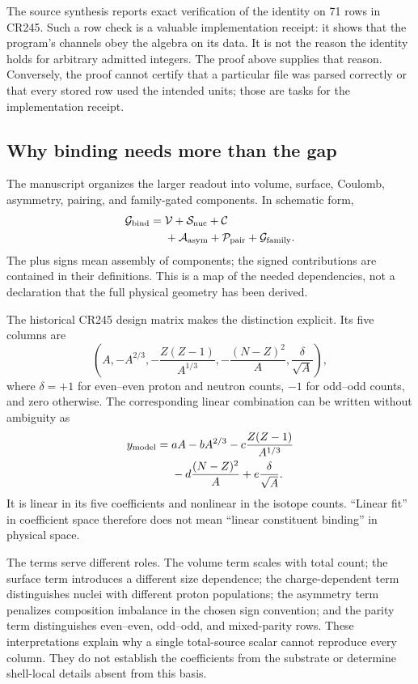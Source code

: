 The source synthesis reports exact verification of the identity on 71 rows in CR245. Such a row check is a valuable implementation receipt: it shows that the program's channels obey the algebra on its data. It is not the reason the identity holds for arbitrary admitted integers. The proof above supplies that reason. Conversely, the proof cannot certify that a particular file was parsed correctly or that every stored row used the intended units; those are tasks for the implementation receipt.\cite{viispine,viicr245}

\subsection{Why binding needs more than the gap}
\label{v2c5:nonlinear}

The manuscript organizes the larger readout into volume, surface, Coulomb, asymmetry, pairing, and family-gated components. In schematic form,
\begin{align}
 \mathcal G_{\rm bind}
 ={}&\mathcal V+\mathcal S_{\rm nuc}+\mathcal C\nonumber\\
   &+\mathcal A_{\rm asym}+\mathcal P_{\rm pair}
    +\mathcal G_{\rm family}.
 \label{v2c5:geometry}
\end{align}
The plus signs mean assembly of components; the signed contributions are contained in their definitions. This is a map of the needed dependencies, not a declaration that the full physical geometry has been derived.

The historical CR245 design matrix makes the distinction explicit. Its five columns are
\begin{equation}
 \left(A,-A^{2/3},-\frac{Z(Z-1)}{A^{1/3}},
       -\frac{(N-Z)^2}{A},\frac{\delta}{\sqrt A}\right),
 \label{v2c5:design}
\end{equation}
where $\delta=+1$ for even--even proton and neutron counts, $-1$ for odd--odd counts, and zero otherwise. The corresponding linear combination can be written without ambiguity as
\begin{align}
 y_{\rm model}={}&aA-bA^{2/3}
 -c\frac{Z(Z-1)}{A^{1/3}}\nonumber\\
 &-d\frac{(N-Z)^2}{A}+e\frac{\delta}{\sqrt A}.
 \label{v2c5:bw}
\end{align}
It is linear in its five coefficients and nonlinear in the isotope counts. ``Linear fit'' in coefficient space therefore does not mean ``linear constituent binding'' in physical space.

The terms serve different roles. The volume term scales with total count; the surface term introduces a different size dependence; the charge-dependent term distinguishes nuclei with different proton populations; the asymmetry term penalizes composition imbalance in the chosen sign convention; and the parity term distinguishes even--even, odd--odd, and mixed-parity rows. These interpretations explain why a single total-source scalar cannot reproduce every column. They do not establish the coefficients from the substrate or determine shell-local details absent from this basis.

